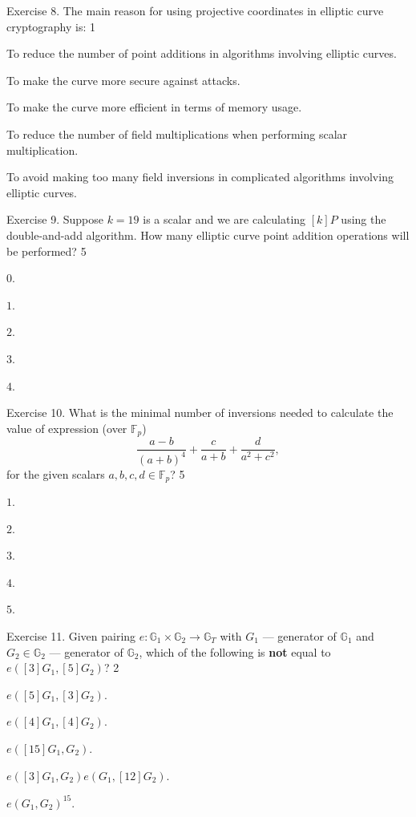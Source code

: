 \documentclass[../lecture-notes-148x210.tex]{subfiles}
\begin{document}
\begin{xexercise}
    {Exercise 8.}
    {The main reason for using projective coordinates in elliptic curve cryptography is:}
    {1}
    {
        \item To reduce the number of point additions in algorithms involving elliptic curves.
        \item To make the curve more secure against attacks.
        \item To make the curve more efficient in terms of memory usage.
        \item To reduce the number of field multiplications when performing scalar multiplication.
        \item To avoid making too many field inversions in complicated algorithms involving elliptic curves.
    }
\end{xexercise}

\begin{xexercise}
    {Exercise 9.}
    {Suppose $k=19$ is a scalar and we are calculating $[k]P$ using the double-and-add algorithm. How many elliptic curve point addition operations will be performed?}
    {5}
    {
        \item $0$.
        \item $1$.
        \item $2$.
        \item $3$.
        \item $4$.
    }
\end{xexercise}

\begin{xexercise}
    {Exercise 10.}
    {What is the minimal number of inversions needed to calculate the value of expression (over $\mathbb{F}_p$)
    \begin{equation*}
        \frac{a-b}{(a+b)^4} + \frac{c}{a+b} + \frac{d}{a^2+c^2},
    \end{equation*}
    for the given scalars $a,b,c,d \in \mathbb{F}_p$?}
    {5}
    {
        \item $1$.
        \item $2$.
        \item $3$.
        \item $4$.
        \item $5$.
    }
\end{xexercise}

\begin{xexercise}
    {Exercise 11.}
    {Given pairing $e: \mathbb{G}_1 \times \mathbb{G}_2 \to \mathbb{G}_T$ with $G_1$ --- generator of $\mathbb{G}_1$ and $G_2 \in \mathbb{G}_2$ --- generator of $\mathbb{G}_2$, which of the following is \textbf{not} equal to $e([3]G_1, [5]G_2)$?}
    {2}
    {
        \item $e([5]G_1, [3]G_2)$.
        \item $e([4]G_1, [4]G_2)$.
        \item $e([15]G_1, G_2)$.
        \item $e([3]G_1,G_2)e(G_1,[12]G_2)$.
        \item $e(G_1, G_2)^{15}$.
    }
\end{xexercise}
\end{document}
